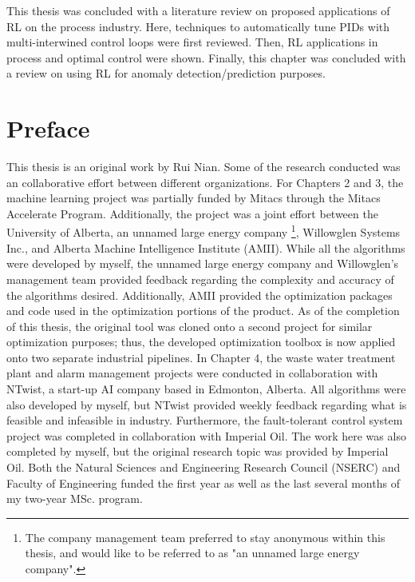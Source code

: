 \documentclass[12pt]{report}
\begin{document}
This thesis was concluded with a literature review on proposed applications of RL on the process industry.  Here, techniques to automatically tune PIDs with multi-interwined control loops were first reviewed. Then, RL applications in process and optimal control were shown.  Finally, this chapter was concluded with a review on using RL for anomaly detection/prediction purposes.




\chapter*{Preface}
This thesis is an original work by Rui Nian. Some of the research conducted was an collaborative effort between different organizations.  For Chapters 2 and 3, the machine learning project was partially funded by Mitacs through the Mitacs Accelerate Program.  Additionally, the project was a joint effort between the University of Alberta, an unnamed large energy company \footnote{The company management team preferred to stay anonymous within this thesis, and would like to be referred to as "an unnamed large energy company".}, Willowglen Systems Inc., and Alberta Machine Intelligence Institute (AMII). While all the algorithms were developed by myself, the unnamed large energy company and Willowglen's management team provided feedback regarding the complexity and accuracy of the algorithms desired. Additionally, AMII provided the optimization packages and code used in the optimization portions of the product. As of the completion of this thesis, the original tool was cloned onto a second project for similar optimization purposes; thus, the developed optimization toolbox is now applied onto two separate industrial pipelines. In Chapter 4, the waste water treatment plant and alarm management projects were conducted in collaboration with NTwist, a start-up AI company based in Edmonton, Alberta. All algorithms were also developed by myself, but NTwist provided weekly feedback regarding what is feasible and infeasible in industry. Furthermore, the fault-tolerant control system project was completed in collaboration with Imperial Oil. The work here was also completed by myself, but the original research topic was provided by Imperial Oil. Both the Natural Sciences and Engineering Research Council (NSERC) and Faculty of Engineering funded the first year as well as the last several months of my two-year MSc. program.
\end{document}
